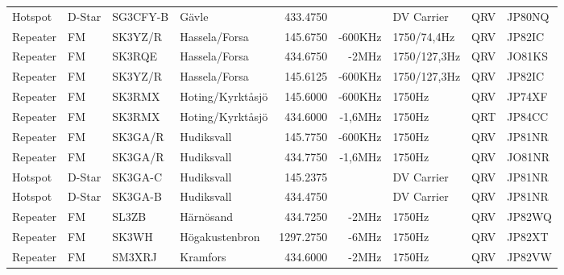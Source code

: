 \begin{landscape}
\begin{longtable}{llllrrlcl}
	Hotspot           & D-Star       & SG3CFY-B      & Gävle            &          433.4750 &                & DV Carrier      &       QRV       & JP80NQ           \\
	Repeater          & FM           & SK3YZ/R       & Hassela/Forsa    &          145.6750 &        -600KHz & 1750/74,4Hz     &       QRV       & JP82IC           \\
	Repeater          & FM           & SK3RQE        & Hassela/Forsa    &          434.6750 &          -2MHz & 1750/127,3Hz    &       QRV       & JO81KS           \\
	Repeater          & FM           & SK3YZ/R       & Hassela/Forsa    &          145.6125 &        -600KHz & 1750/127,3Hz    &       QRV       & JP82IC           \\
	Repeater          & FM           & SK3RMX        & Hoting/Kyrktåsjö &          145.6000 &        -600KHz & 1750Hz          &       QRV       & JP74XF           \\
	Repeater          & FM           & SK3RMX        & Hoting/Kyrktåsjö &          434.6000 &        -1,6MHz & 1750Hz          &       QRT       & JP84CC           \\
	Repeater          & FM           & SK3GA/R       & Hudiksvall       &          145.7750 &        -600KHz & 1750Hz          &       QRV       & JP81NR           \\
	Repeater          & FM           & SK3GA/R       & Hudiksvall       &          434.7750 &        -1,6MHz & 1750Hz          &       QRV       & JO81NR           \\
	Hotspot           & D-Star       & SK3GA-C       & Hudiksvall       &          145.2375 &                & DV Carrier      &       QRV       & JP81NR           \\
	Hotspot           & D-Star       & SK3GA-B       & Hudiksvall       &          434.4750 &                & DV Carrier      &       QRV       & JP81NR           \\
	Repeater          & FM           & SL3ZB         & Härnösand        &          434.7250 &          -2MHz & 1750Hz          &       QRV       & JP82WQ           \\
	Repeater          & FM           & SK3WH         & Högakustenbron   &         1297.2750 &          -6MHz & 1750Hz          &       QRV       & JP82XT           \\
	Repeater          & FM           & SM3XRJ        & Kramfors         &          434.6000 &          -2MHz & 1750Hz          &       QRV       & JP82VW           \\

\end{longtable}
\end{landscape}
